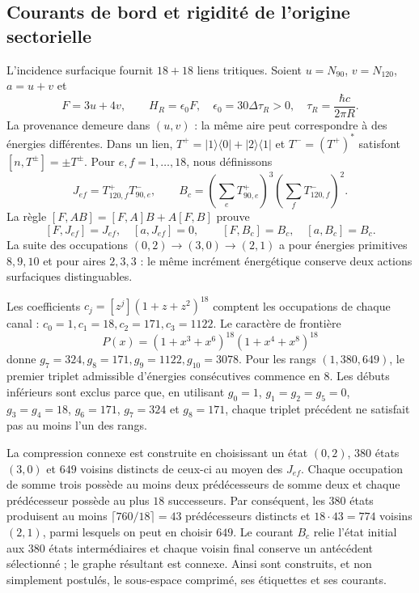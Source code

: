 \subsection{Courants de bord et rigidité de l’origine sectorielle}

L’incidence surfacique fournit $18+18$ liens tritiques. Soient
$u=N_{90}$, $v=N_{120}$, $a=u+v$ et
\[
 F=3u+4v,\qquad H_R=\epsilon_0F,
 \quad \epsilon_0=30\Delta\tau_R>0,
 \quad \tau_R=\frac{\hbar c}{2\pi R}.
\]
La provenance demeure dans $(u,v)$ : la même aire peut correspondre à
des énergies différentes. Dans un lien,
$T^+=|1\rangle\langle0|+|2\rangle\langle1|$ et $T^-=(T^+)^*$ satisfont
$[n,T^\pm]=\pm T^\pm$. Pour $e,f=1,\ldots,18$, nous définissons
\[
 J_{ef}=T^+_{120,f}T^-_{90,e},\qquad
 B_c=\left(\sum_eT^+_{90,e}\right)^3
     \left(\sum_fT^-_{120,f}\right)^2.
\]
La règle $[F,AB]=[F,A]B+A[F,B]$ prouve
\[
 [F,J_{ef}]=J_{ef},\quad[a,J_{ef}]=0,
 \qquad [F,B_c]=B_c,\quad[a,B_c]=B_c.
\]
La suite des occupations
$(0,2)\to(3,0)\to(2,1)$ a pour énergies primitives $8,9,10$ et pour aires
$2,3,3$ : le même incrément énergétique conserve deux actions surfaciques
distinguables.

Les coefficients $c_j=[z^j](1+z+z^2)^{18}$ comptent les occupations de
chaque canal : $c_0=1,c_1=18,c_2=171,c_3=1122$. Le caractère de frontière
\[
 P(x)=(1+x^3+x^6)^{18}(1+x^4+x^8)^{18}
\]
donne $g_7=324,g_8=171,g_9=1122,g_{10}=3078$. Pour les rangs
$(1,380,649)$, le premier triplet admissible d’énergies consécutives commence
en $8$. Les débuts inférieurs sont exclus parce que, en utilisant
$g_0=1$, $g_1=g_2=g_5=0$, $g_3=g_4=18$, $g_6=171$, $g_7=324$ et
$g_8=171$, chaque triplet précédent ne satisfait pas au moins l’un des rangs.

La compression connexe est construite en choisissant un état $(0,2)$,
$380$ états $(3,0)$ et $649$ voisins distincts de ceux-ci au moyen des
$J_{ef}$. Chaque occupation de somme trois possède au moins deux prédécesseurs de
somme deux et chaque prédécesseur possède au plus $18$ successeurs. Par conséquent,
les $380$ états produisent au moins
$\lceil760/18\rceil=43$ prédécesseurs distincts et
$18\cdot43=774$ voisins $(2,1)$, parmi lesquels on peut en choisir $649$.
Le courant $B_c$ relie l’état initial aux $380$ états
intermédiaires et chaque voisin final conserve un antécédent sélectionné ; le
graphe résultant est connexe. Ainsi sont construits, et non simplement
postulés, le sous-espace comprimé, ses étiquettes et ses courants.


